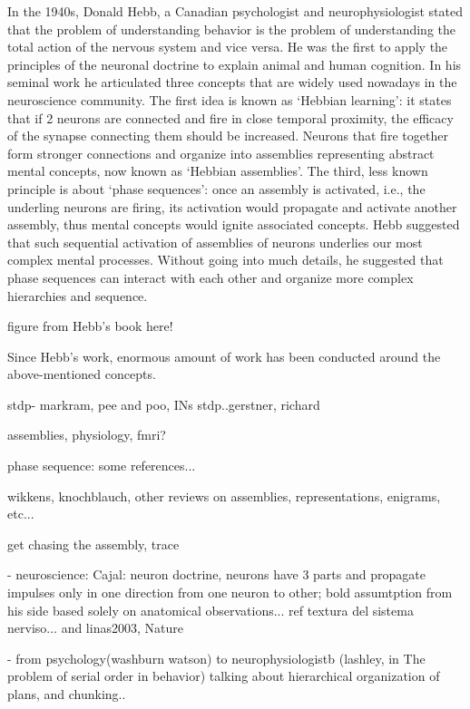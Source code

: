  In the 1940s, Donald Hebb, a Canadian psychologist and neurophysiologist
  stated that the problem of understanding behavior is the problem of understanding the total action of the nervous system and vice versa.
  He was the first to apply the principles of the neuronal
  doctrine \cite{Cajal} to explain animal and human cognition. In his seminal
  work \cite{Hebb49} he articulated three concepts that are widely used
  nowadays in the neuroscience community. The first idea is known as `Hebbian
  learning': it states that if 2 neurons are connected and fire in close
  temporal proximity, the efficacy of the synapse connecting them should be
  increased. Neurons that fire together form stronger connections and organize
  into assemblies representing abstract mental concepts, now known as `Hebbian
  assemblies'. The third, less known principle is about `phase sequences': once
  an assembly is activated, i.e., the underling neurons are firing, its
  activation would propagate and activate another assembly, thus mental
  concepts would ignite associated concepts. Hebb suggested that such
  sequential activation of assemblies of neurons underlies our most complex
  mental processes. Without going into much details, he suggested that phase
  sequences can interact with each other and organize more complex hierarchies
  and sequence.

  figure from Hebb's book here!

  Since Hebb's work, enormous amount of work has been conducted around the above-mentioned concepts. 


  stdp- markram, pee and poo, INs stdp..gerstner, richard

  assemblies, physiology, fmri?

  phase sequence: some references...

  wikkens, knochblauch, other reviews on assemblies, representations, enigrams, etc...

  get chasing the assembly, trace


  - neuroscience:
    Cajal: neuron doctrine, neurons have 3 parts and propagate impulses only in
    one direction from one neuron to other; bold assumtption from his side
    based solely on anatomical observations... ref textura del sistema nerviso... and linas2003, Nature 


    - from psychology(washburn watson) to neurophysiologistb (lashley, in The problem of serial order in behavior) talking about hierarchical organization of plans, and chunking..

